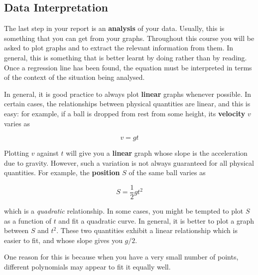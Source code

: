 
\subsection{Data Interpretation}

The last step in your report is an \textbf{analysis} of your data. Usually, this is something that you can get from your graphs. Throughout this course you will be asked to plot graphs and to extract the relevant information from them. In general, this is something that is better learnt by doing rather than by reading.  Once a regression line has been found, the equation must be interpreted in terms of the context of the situation being analysed.

In general, it is good practice to always plot \textbf{linear} graphs whenever possible. In certain cases, the relationships between physical quantities are linear, and this is easy: for example, if a ball is dropped from rest from some height, its \textbf{velocity} $v$ varies as

\begin{equation*}
    v = g t
\end{equation*}

Plotting $v$ against $t$ will give you a \textbf{linear} graph whose slope is the acceleration due to gravity. However, such a variation is not always guaranteed for all physical quantities. For example, the \textbf{position} $S$ of the same ball varies as

\begin{equation*}
    S = \frac{1}{2} g t^2
\end{equation*}

which is a \textit{quadratic} relationship. In some cases, you might be tempted to plot $S$ as a function of $t$ and fit a quadratic curve. In general, it is better to plot a graph between $S$ and $t^2$. These two quantities exhibit a linear relationship which is easier to fit, and whose slope gives you $g/2$.

One reason for this is because when you have a very small number of points, different polynomials may appear to fit it equally well.



